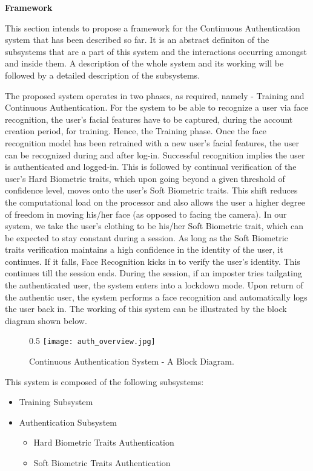 \documentclass[12pt]{article}			%
\begin{document}

\begin{center}
	{\LARGE \bf Framework}

\end{center}
This section intends to propose a framework for the Continuous Authentication system that has been described so far. It is an abstract definiton of the subsystems that are a part of this system and the interactions occurring amongst and inside them. A description of the whole system and its working will be followed by a detailed description of the subsystems.

The proposed system operates in two phases, as required, namely - Training and Continuous Authentication. For the system to be able to recognize a user via face recognition, the user's facial features have to be captured, during the account creation period, for training. Hence, the Training phase. Once the face recognition model has been retrained with a new user's facial features, the user can be recognized during and after log-in. Successful recognition implies the user is authenticated and logged-in. This is followed by continual verification of the user's Hard Biometric traits, which upon going beyond a given threshold of confidence level, moves onto the user's Soft Biometric traits. This shift reduces the computational load on the processor and also allows the user a higher degree of freedom in moving his/her face (as opposed to facing the camera). In our system, we take the user's clothing to be his/her Soft Biometric trait, which can be expected to stay constant during a session. As long as the Soft Biometric traits verification maintains a high confidence in the identity of the user, it continues. If it falls, Face Recognition kicks in to verify the user's identity. This continues till the session ends. During the session, if an imposter tries tailgating the authenticated user, the system enters into a lockdown mode. Upon return of the authentic user, the system performs a face recognition and automatically logs the user back in. The working of this system can be illustrated by the block diagram shown below. 

\begin{figure}[h!]{0.5\textwidth}
        \centering
        \texttt{[image: auth\_overview.jpg]}
        \caption{Continuous Authentication System - A Block Diagram.}
        \label{fig:block_diag}
\end{figure}

This system is composed of the following subsystems:
\begin{itemize}
\item Training Subsystem
\item Authentication Subsystem
	\begin{itemize}
	\item Hard Biometric Traits Authentication
	\item Soft Biometric Traits Authentication
	\end{itemize} 
\end{itemize} 
\end{document}
